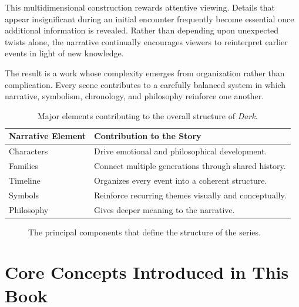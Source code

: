 \documentclass[12pt,oneside,openany]{book}
\begin{document}
This multidimensional construction rewards attentive viewing.
Details that appear insignificant during an initial encounter frequently
become essential once additional information is revealed. Rather than
depending upon unexpected twists alone, the narrative continually
encourages viewers to reinterpret earlier events in light of new
knowledge.

The result is a work whose complexity emerges from organization rather
than complication. Every scene contributes to a carefully balanced system
in which narrative, symbolism, chronology, and philosophy reinforce one
another.

\begin{table}[H]
\centering
\begin{tabular}{|p{4.2cm}|p{8.3cm}|}
\hline
\textbf{Narrative Element} & \textbf{Contribution to the Story} \\
\hline
Characters & Drive emotional and philosophical development.\\
\hline
Families & Connect multiple generations through shared history.\\
\hline
Timeline & Organizes every event into a coherent structure.\\
\hline
Symbols & Reinforce recurring themes visually and conceptually.\\
\hline
Philosophy & Gives deeper meaning to the narrative.\\
\hline
\end{tabular}
\caption{Major elements contributing to the overall structure of \textit{Dark}.}
\end{table}

\begin{figure}[H]
\centering
{}
\caption{The principal components that define the structure of the series.}
\end{figure}
\section{Core Concepts Introduced in This Book}
\end{document}
